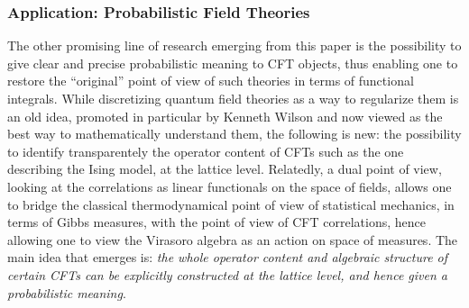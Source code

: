 \documentclass[12pt,oneside,english]{amsart}
\numberwithin{equation}{section}
\numberwithin{figure}{section}
\theoremstyle{plain}
\theoremstyle{plain}
\theoremstyle{plain}
\theoremstyle{plain}
\theoremstyle{remark}
\theoremstyle{definition}
\theoremstyle{plain}
\theoremstyle{plain}
\numberwithin{thm}{section}
\begin{document}
\subsubsection{Application: Probabilistic Field Theories}

The other promising line of research emerging from this paper is the
possibility to give clear and precise probabilistic meaning to CFT
objects, thus enabling one to restore the ``original'' point of
view of such theories in terms of functional integrals. While discretizing
quantum field theories as a way to regularize them is an old idea,
promoted in particular by Kenneth Wilson \cite{cardy-ii,wilson-kogut}
and now viewed as the best way to mathematically understand them,
the following is new: the possibility to identify transparentely the
operator content of CFTs such as the one describing the Ising model,
at the lattice level. Relatedly, a dual point of view, looking at
the correlations as linear functionals on the space of fields, allows
one to bridge the classical thermodynamical point of view of statistical
mechanics, in terms of Gibbs measures, with the point of view of CFT
correlations, hence allowing one to view the Virasoro algebra as an
action on space of measures. The main idea that emerges is: \emph{the
whole operator content and algebraic structure of certain CFTs can
be explicitly constructed at the lattice level, and hence given a
probabilistic meaning}.
\end{document}
